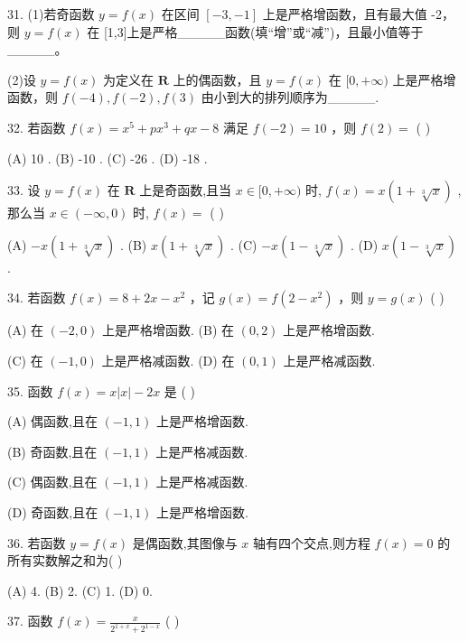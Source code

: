 \documentclass[10pt]{article}
\begin{document}
31. (1)若奇函数 \(y = f\left( x\right)\) 在区间 \(\left\lbrack  {-3, - 1}\right\rbrack\) 上是严格增函数，且有最大值 -2，则 \(y = f\left( x\right)\) 在 [1,3]上是严格\_\_\_\_\_函数(填“增”或“减”)，且最小值等于\_\_\_\_\_。

(2)设 \(y = f\left( x\right)\) 为定义在 \(\mathbf{R}\) 上的偶函数，且 \(y = f\left( x\right)\) 在 \(\lbrack 0, + \infty )\) 上是严格增函数，则 \(f\left( {-4}\right) ,f\left( {-2}\right) ,f\left( 3\right)\) 由小到大的排列顺序为\_\_\_\_\_.

32. 若函数 \(f\left( x\right)  = {x}^{5} + p{x}^{3} + {qx} - 8\) 满足 \(f\left( {-2}\right)  = {10}\) ，则 \(f\left( 2\right)  =\) (   )

(A) 10 . (B) -10 . (C) -26 . (D) -18 .

33. 设 \(y = f\left( x\right)\) 在 \(\mathbf{R}\) 上是奇函数,且当 \(x \in  \lbrack 0, + \infty )\) 时, \(f\left( x\right)  = x\left( {1 + \sqrt[3]{x}}\right)\) ,那么当 \(x \in  \left( {-\infty ,0}\right)\) 时, \(f\left( x\right)  =\) (   )

(A) \(- x\left( {1 + \sqrt[3]{x}}\right)\) . (B) \(x\left( {1 + \sqrt[3]{x}}\right)\) . (C) \(- x\left( {1 - \sqrt[3]{x}}\right)\) . (D) \(x\left( {1 - \sqrt[3]{x}}\right)\) .

34. 若函数 \(f\left( x\right)  = 8 + {2x} - {x}^{2}\) ，记 \(g\left( x\right)  = f\left( {2 - {x}^{2}}\right)\) ，则 \(y = g\left( x\right)\) ( )

(A) 在 \(\left( {-2,0}\right)\) 上是严格增函数. (B) 在 \(\left( {0,2}\right)\) 上是严格增函数.

(C) 在 \(\left( {-1,0}\right)\) 上是严格减函数. (D) 在 \(\left( {0,1}\right)\) 上是严格减函数.

35. 函数 \(f\left( x\right)  = x\left| x\right|  - {2x}\) 是 ( )

(A) 偶函数,且在 \(\left( {-1,1}\right)\) 上是严格增函数.

(B) 奇函数,且在 \(\left( {-1,1}\right)\) 上是严格减函数.

(C) 偶函数,且在 \(\left( {-1,1}\right)\) 上是严格减函数.

(D) 奇函数,且在 \(\left( {-1,1}\right)\) 上是严格增函数.

36. 若函数 \(y = f\left( x\right)\) 是偶函数,其图像与 \(x\) 轴有四个交点,则方程 \(f\left( x\right)  = 0\) 的所有实数解之和为( )

(A) 4. (B) 2. (C) 1. (D) 0.

37. 函数 \(f\left( x\right)  = \frac{x}{{2}^{1 + x} + {2}^{1 - x}}\) (   )
\end{document}
